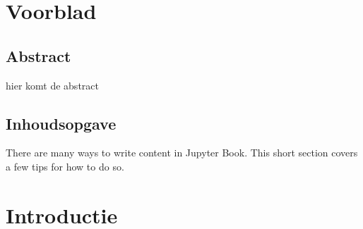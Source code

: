 \documentclass[letterpaper,10pt,english]{jupyterBook}
\begin{document}
\begin{sphinxVerbatim}[commandchars=\\\{\}]
\end{sphinxVerbatim}


\part{Voorblad}


\chapter{Abstract}
\label{\detokenize{abstract:abstract}}\label{\detokenize{abstract::doc}}
\sphinxAtStartPar
hier komt de abstract


\chapter{Inhoudsopgave}
\label{\detokenize{inhoudsopgave:inhoudsopgave}}\label{\detokenize{inhoudsopgave::doc}}
\sphinxAtStartPar
There are many ways to write content in Jupyter Book. This short section
covers a few tips for how to do so.


\part{Introductie}
\end{document}
